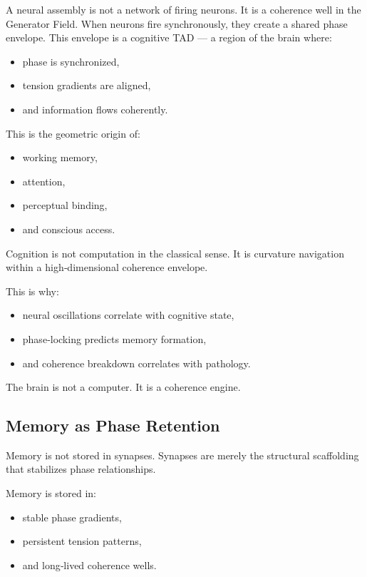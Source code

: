 \documentclass[reprint,amsmath,amssymb,aps,prl,floatfix]{revtex4-2}
\begin{document}
\begin{itemize}
A neural assembly is not a network of firing neurons. It is a coherence well in the Generator Field. When neurons fire synchronously, they create a shared phase envelope. This envelope is a cognitive TAD — a region of the brain where:

\begin{itemize}
\item phase is synchronized,  
\item tension gradients are aligned,  
\item and information flows coherently.
\end{itemize}
\medskip

This is the geometric origin of:
\begin{itemize}
\item working memory,  
\item attention,  
\item perceptual binding,  
\item and conscious access.
\end{itemize}
\medskip

Cognition is not computation in the classical sense.  
It is curvature navigation within a high‑dimensional coherence envelope.
\medskip

This is why:
\begin{itemize}
\item neural oscillations correlate with cognitive state,  
\item phase‑locking predicts memory formation,  
\item and coherence breakdown correlates with pathology.
\end{itemize}
\medskip

The brain is not a computer.  
It is a coherence engine.

\subsection{Memory as Phase Retention}

Memory is not stored in synapses.  
Synapses are merely the structural scaffolding that stabilizes phase relationships.
\medskip

Memory is stored in:
\begin{itemize}
\item stable phase gradients,  
\item persistent tension patterns,  
\item and long‑lived coherence wells.
\end{itemize}
\medskip


\end{itemize}
\end{document}
